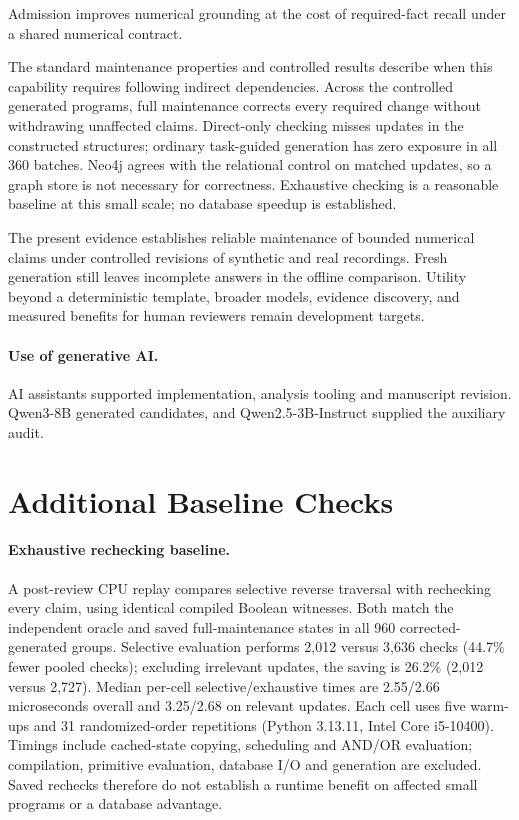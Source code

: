 \documentclass[runningheads]{llncs}
\begin{document}
Admission improves numerical grounding at the cost of required-fact recall
under a shared numerical contract.

The standard maintenance properties and controlled results describe when
this capability requires following indirect dependencies. Across the controlled generated
programs, full maintenance corrects every required change without
withdrawing unaffected claims. Direct-only checking misses updates in the constructed structures;
ordinary task-guided generation has zero exposure in all 360 batches.
Neo4j agrees with the relational control on matched updates, so a graph
store is not necessary for correctness. Exhaustive checking is a reasonable
baseline at this small scale; no database speedup is established.

The present evidence establishes reliable maintenance of bounded numerical
claims under controlled revisions of synthetic and real recordings.
Fresh generation still leaves incomplete answers in the offline comparison.
Utility beyond a deterministic template, broader models, evidence discovery,
and measured benefits for human reviewers remain development targets.



\paragraph{Use of generative AI.}
AI assistants supported implementation, analysis tooling and manuscript revision.
Qwen3-8B generated candidates, and Qwen2.5-3B-Instruct supplied the auxiliary audit.

 \clearpage
\label{page:appendix}
\appendix
\section{Additional Baseline Checks}
\label{sec:baselinechecks}
\paragraph{Exhaustive rechecking baseline.}
A post-review CPU replay compares selective reverse traversal with rechecking
every claim, using identical compiled Boolean witnesses. Both match the independent
oracle and saved full-maintenance states in all 960 corrected-generated groups.
Selective evaluation performs 2,012 versus 3,636 checks (44.7\% fewer pooled checks);
excluding irrelevant updates, the saving is 26.2\% (2,012 versus 2,727).
Median per-cell selective/exhaustive times are 2.55/2.66 microseconds overall
and 3.25/2.68 on relevant updates. Each cell uses five warm-ups and 31 randomized-order
repetitions (Python 3.13.11, Intel Core i5-10400). Timings include cached-state
copying, scheduling and AND/OR evaluation; compilation, primitive evaluation,
database I/O and generation are excluded. Saved rechecks therefore do not
establish a runtime benefit on affected small programs or a database advantage.
\end{document}
